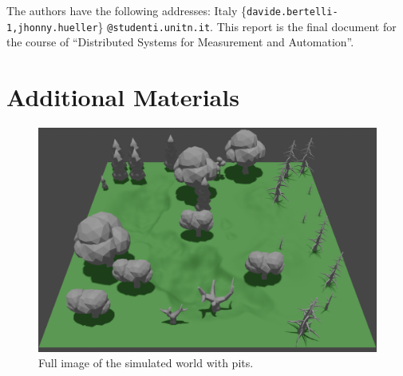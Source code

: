 \documentclass[twocolumn, a4paper]{article}
\begin{document}
\vfill
\footnotesize{
    The authors have the following addresses: Italy\newline
    \small{\{\texttt{davide.bertelli-1,jhonny.hueller}\}%
             \texttt{@studenti.unitn.it}.}
    \footnotesize{
    This report is the final document for the course of “Distributed Systems
    for Measurement and Automation”.}
}

\newpage
\section{Additional Materials}
\begin{figure}[!h]
    \centering
    \includegraphics[width=18cm]{"../Report_images/World.png"}
    \caption{Full image of the simulated world with pits.}
\end{figure}
\end{document}
